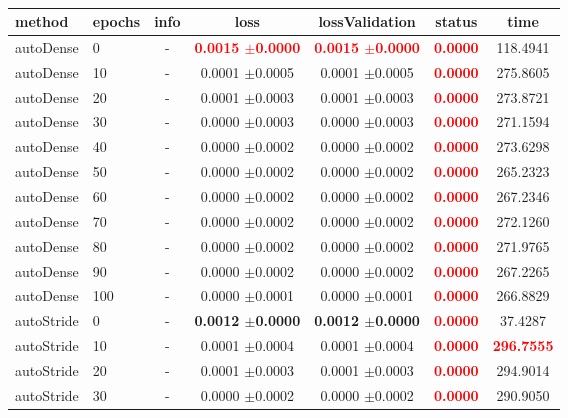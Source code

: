   
\begin{table} 
\begin{center} 
\ 
 \setlength{\tabcolsep}{.16667em} 
\begin{tabular}{llccccc} 
method & epochs & info & loss & lossValidation & status & time \\ 
\hline 
autoDense &   0 & - & \textbf{\textcolor{red}{0.0015 $\pm$0.0000}} & \textbf{\textcolor{red}{0.0015 $\pm$0.0000}} & \textbf{\textcolor{red}{0.0000}} & 118.4941 \\ 
autoDense &  10 & - & 0.0001 $\pm$0.0005 & 0.0001 $\pm$0.0005 & \textbf{\textcolor{red}{0.0000}} & 275.8605 \\ 
autoDense &  20 & - & 0.0001 $\pm$0.0003 & 0.0001 $\pm$0.0003 & \textbf{\textcolor{red}{0.0000}} & 273.8721 \\ 
autoDense &  30 & - & 0.0000 $\pm$0.0003 & 0.0000 $\pm$0.0003 & \textbf{\textcolor{red}{0.0000}} & 271.1594 \\ 
autoDense &  40 & - & 0.0000 $\pm$0.0002 & 0.0000 $\pm$0.0002 & \textbf{\textcolor{red}{0.0000}} & 273.6298 \\ 
autoDense &  50 & - & 0.0000 $\pm$0.0002 & 0.0000 $\pm$0.0002 & \textbf{\textcolor{red}{0.0000}} & 265.2323 \\ 
autoDense &  60 & - & 0.0000 $\pm$0.0002 & 0.0000 $\pm$0.0002 & \textbf{\textcolor{red}{0.0000}} & 267.2346 \\ 
autoDense &  70 & - & 0.0000 $\pm$0.0002 & 0.0000 $\pm$0.0002 & \textbf{\textcolor{red}{0.0000}} & 272.1260 \\ 
autoDense &  80 & - & 0.0000 $\pm$0.0002 & 0.0000 $\pm$0.0002 & \textbf{\textcolor{red}{0.0000}} & 271.9765 \\ 
autoDense &  90 & - & 0.0000 $\pm$0.0002 & 0.0000 $\pm$0.0002 & \textbf{\textcolor{red}{0.0000}} & 267.2265 \\ 
autoDense & 100 & - & 0.0000 $\pm$0.0001 & 0.0000 $\pm$0.0001 & \textbf{\textcolor{red}{0.0000}} & 266.8829 \\ 
autoStride &   0 & - & \textbf{0.0012 $\pm$0.0000} & \textbf{0.0012 $\pm$0.0000} & \textbf{\textcolor{red}{0.0000}} &  37.4287 \\ 
autoStride &  10 & - & 0.0001 $\pm$0.0004 & 0.0001 $\pm$0.0004 & \textbf{\textcolor{red}{0.0000}} & \textbf{\textcolor{red}{296.7555}} \\ 
autoStride &  20 & - & 0.0001 $\pm$0.0003 & 0.0001 $\pm$0.0003 & \textbf{\textcolor{red}{0.0000}} & 294.9014 \\ 
autoStride &  30 & - & 0.0000 $\pm$0.0002 & 0.0000 $\pm$0.0002 & \textbf{\textcolor{red}{0.0000}} & 290.9050 \\ 

\end{tabular}
\end{center}
\end{table}
